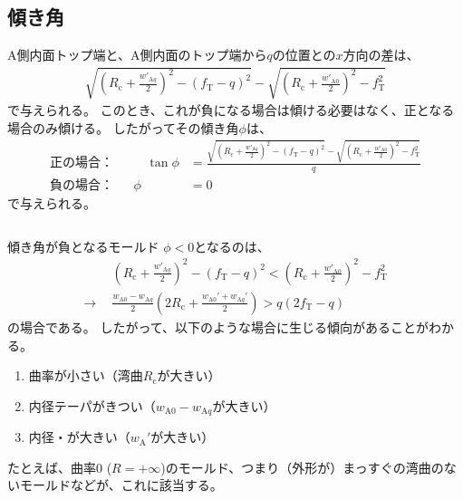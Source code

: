 \subsection{傾き角}
A側内面トップ端と、A側内面のトップ端から$q$の位置との$x$方向の差は、
\begin{align*}
  \sqrt{\left(R_\mathrm c+\frac{w'_{\mathrm Aq}}2\right)^2-(f_\mathrm T-q)^2}
  -\sqrt{\left(R_\mathrm c+\frac{w'_{\mathrm A0}}2\right)^2-f_\mathrm T^2}
\end{align*}
で与えられる。
このとき、これが負になる場合は傾ける必要はなく、正となる場合のみ傾ける。
したがってその傾き角$\phi$は、
\begin{subequations}
\label{eq:dKatamuki}
\begin{alignat}{2}
  \text{正の場合：}&&\quad
  \tan\phi
  &= \frac{\displaystyle
           \sqrt{\left(R_\mathrm c+\frac{w'_{\mathrm Aq}}2\right)^2-(f_\mathrm T-q)^2}
           -\sqrt{\left(R_\mathrm c+\frac{w'_{\mathrm A0}}2\right)^2-f_\mathrm T^2}}q\\[8pt]
  \text{負の場合：}&&
  \phi
  &= 0
\end{alignat}
\end{subequations}
で与えられる。
\begin{Column}{傾き角が負となるモールド}
$\phi < 0$となるのは、
\begin{align*}
  & \left(R_\mathrm c+\frac{w'_{\mathrm Aq}}2\right)^2-(f_\mathrm T-q)^2
    < \left(R_\mathrm c+\frac{w'_{\mathrm A0}}2\right)^2-f_\mathrm T^2\\
  \longrightarrow~~
  & \frac{w_{\mathrm A0}-w_{\mathrm Aq}}2
    \left(2R_\mathrm c+\frac{w_{\mathrm A0}'+w_{\mathrm Aq}'}2\right)
    > q(2f_\mathrm T-q)
\end{align*}
の場合である。
したがって、以下のような場合に生じる傾向があることがわかる。
\begin{enumerate}
\item {}曲率が小さい（湾曲$R_\mathrm c$が大きい）
\item {}内径テーパがきつい（$w_{\mathrm A0}-w_{\mathrm Aq}$が大きい）
\item {}内径・\PlatingThk が大きい（$w_\mathrm A'$が大きい）
\end{enumerate}
たとえば、曲率0 ($R = +\infty$)のモールド、つまり（外形が）まっすぐの湾曲のないモールドなどが、これに該当する。
\end{Column}
